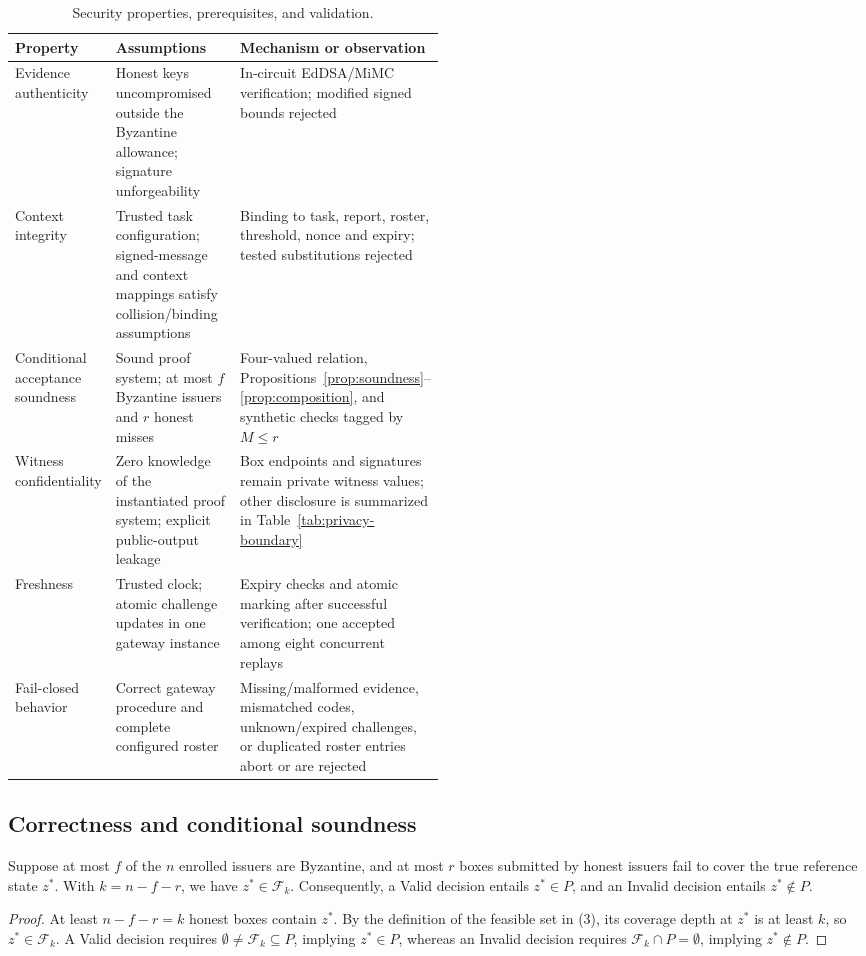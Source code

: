 \begin{table}[htbp]\centering\footnotesize
\caption{Security properties, prerequisites, and validation.}\label{tab:security-properties}
\begin{tabularx}{\linewidth}{@{}p{0.20\linewidth}p{0.30\linewidth}X@{}}\toprule
Property & Assumptions & Mechanism or observation\\\midrule
Evidence authenticity & Honest keys uncompromised outside the Byzantine allowance; signature unforgeability & In-circuit EdDSA/MiMC verification; modified signed bounds rejected\\
Context integrity & Trusted task configuration; signed-message and context mappings satisfy collision/binding assumptions & Binding to task, report, roster, threshold, nonce and expiry; tested substitutions rejected\\
Conditional acceptance soundness & Sound proof system; at most $f$ Byzantine issuers and $r$ honest misses & Four-valued relation, Propositions~\ref{prop:soundness}--\ref{prop:composition}, and synthetic checks tagged by $M\le r$\\
Witness confidentiality & Zero knowledge of the instantiated proof system; explicit public-output leakage & Box endpoints and signatures remain private witness values; other disclosure is summarized in Table~\ref{tab:privacy-boundary}\\
Freshness & Trusted clock; atomic challenge updates in one gateway instance & Expiry checks and atomic marking after successful verification; one accepted among eight concurrent replays\\
Fail-closed behavior & Correct gateway procedure and complete configured roster & Missing/malformed evidence, mismatched codes, unknown/expired challenges, or duplicated roster entries abort or are rejected\\\bottomrule
\end{tabularx}\end{table}

\subsection{Correctness and conditional soundness}
\begin{proposition}\label{prop:soundness}
Suppose at most $f$ of the $n$ enrolled issuers are Byzantine, and at most $r$ boxes submitted by honest issuers fail to cover the true reference state $z^*$. With $k = n - f - r$, we have $z^* \in \mathcal{F}_k$. Consequently, a Valid decision entails $z^* \in P$, and an Invalid decision entails $z^* \notin P$.
\end{proposition}
\begin{proof}
At least $n - f - r = k$ honest boxes contain $z^*$. By the definition of the feasible set in (3), its coverage depth at $z^*$ is at least $k$, so $z^* \in \mathcal{F}_k$. A Valid decision requires $\emptyset \neq \mathcal{F}_k \subseteq P$, implying $z^* \in P$, whereas an Invalid decision requires $\mathcal{F}_k \cap P = \emptyset$, implying $z^* \notin P$.
\end{proof}

